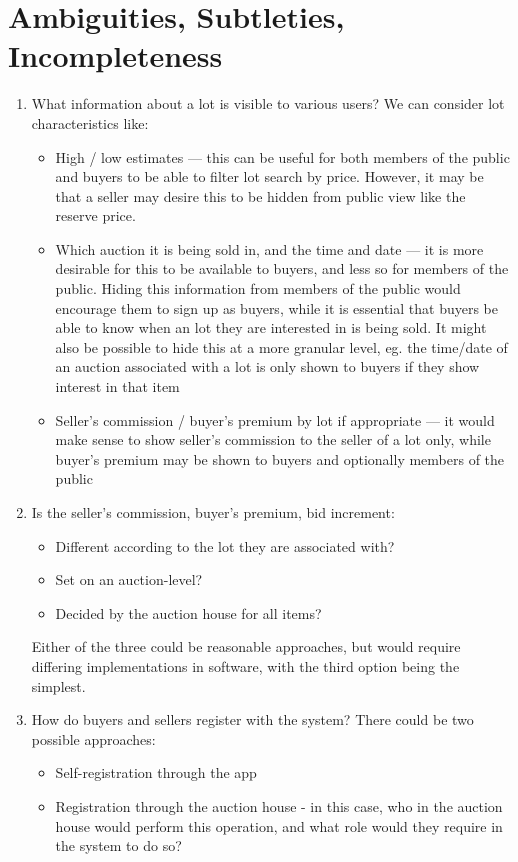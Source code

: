 \documentclass[titlepage, 12pt]{extarticle}
\begin{document}
\section{Ambiguities, Subtleties, Incompleteness}
\begin{enumerate}
\item What information about a lot is visible to various users? We can consider lot characteristics like:
  \begin{itemize}
  \item High / low estimates --- this can be useful for both members of the public and buyers to be able to filter lot search by price. However, it may be that a seller may desire this to be hidden from public view like the reserve price. 
  \item Which auction it is being sold in, and the time and date --- it is more desirable for this to be available to buyers, and less so for members of the public. Hiding this information from members of the public would encourage them to sign up as buyers, while it is essential that buyers be able to know when an lot they are interested in is being sold. It might also be possible to hide this at a more granular level, eg. the time/date of an auction associated with a lot is only shown to buyers if they show interest in that item
  \item Seller's commission / buyer's premium by lot if appropriate --- it would make sense to show seller's commission to the seller of a lot only, while buyer's premium may be shown to buyers and optionally members of the public
  \end{itemize}
\item Is the seller's commission, buyer's premium, bid increment:
  \begin{itemize}
  \item Different according to the lot they are associated with?
  \item Set on an auction-level?
  \item Decided by the auction house for all items?
  \end{itemize}
  Either of the three could be reasonable approaches, but would require differing implementations in software, with the third option being the simplest.
\item How do buyers and sellers register with the system? There could be two possible approaches:
  \begin{itemize}
  \item Self-registration through the app
  \item Registration through the auction house - in this case, who in the auction house would perform this operation, and what role would they require in the system to do so?

\end{itemize}
\end{enumerate}
\end{document}
